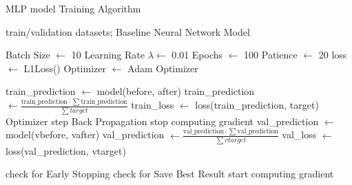 \begin{algorithm}[H]
	\caption{MLP model Training Algorithm}\label{alg:ufcntraining}
	\begin{algorithmic}
		\Require train/validation datasets; Baseline Neural Network Model

		\State Batch Size $\gets$ 10
		\State Learning Rate $\lambda \gets$ 0.01
		\State Epochs $\gets$ 100
		\State Patience $\gets$ 20
		\State loss $\gets$ L1Loss()
		\State Optimizer $\gets$ Adam Optimizer
		\State

		\State train\_prediction $\gets$ model(before, after) 
		\State train\_prediction $\gets \frac{\text{train\_prediction} \cdot \sum\text{train\_prediction}}{\sum target}$ 
		\State train\_loss $\gets$ loss(train\_prediction, target)
		\State Optimizer step
		\State Back Propagation
		\EndFor
		\State stop computing gradient
		\State val\_prediction $\gets$ model(vbefore, vafter) 
		\State val\_prediction $\gets \frac{\text{val\_prediction} \cdot \sum\text{val\_prediction}}{\sum vtarget}$ 
		\State val\_loss $\gets$ loss(val\_prediction, vtarget)
		\EndFor

		\State check for Early Stopping
		\State check for Save Best Result
		\State start computing gradient
		\EndFor
	\end{algorithmic}
\end{algorithm}

